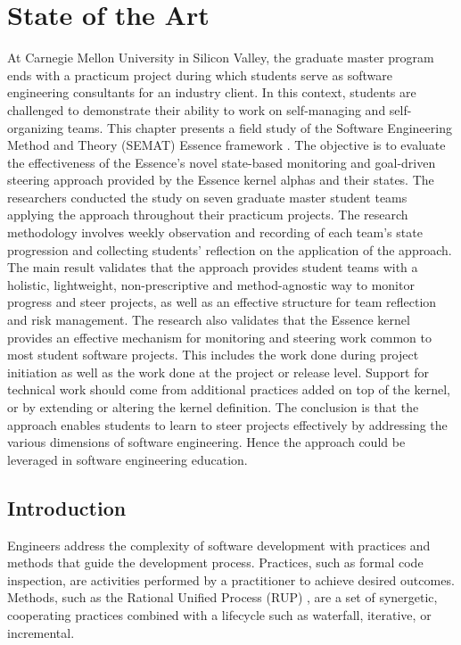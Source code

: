 \chapter{State of the Art}

At Carnegie Mellon University in Silicon Valley, the graduate master program ends with a practicum project during which students serve as software engineering consultants for an industry client. In this context, students are challenged to demonstrate their ability to work on self-managing and self-organizing teams. This chapter presents a field study of the Software Engineering Method and Theory (SEMAT) Essence framework \cite{SEMATKernel, EssenceBook}. The objective is to evaluate the effectiveness of the Essence's novel state-based monitoring and goal-driven steering approach provided by the Essence kernel alphas and their states. The researchers conducted the study on seven graduate master student teams applying the approach throughout their practicum projects. The research methodology involves weekly observation and recording of each team's state progression and collecting students' reflection on the application of the approach. The main result validates that the approach provides student teams with a holistic, lightweight, non-prescriptive and method-agnostic way to monitor progress and steer projects, as well as an effective structure for team reflection and risk management. The research also validates that the Essence kernel provides an effective mechanism for monitoring and steering work common to most student software projects. This includes the work done during project initiation as well as the work done at the project or release level. Support for technical work should come from additional practices added on top of the kernel, or by extending or altering the kernel definition. The conclusion is that the approach enables students to learn to steer projects effectively by addressing the various dimensions of software engineering. Hence the approach could be leveraged in software engineering education.

\section{Introduction}
Engineers address the complexity of software development with practices and methods that guide the development process. Practices, such as formal code inspection, are activities performed by a practitioner to achieve desired outcomes. Methods, such as the Rational Unified Process (RUP) \cite{KrollRUP}, are a set of synergetic, cooperating practices combined with a lifecycle such as waterfall, iterative, or incremental.

